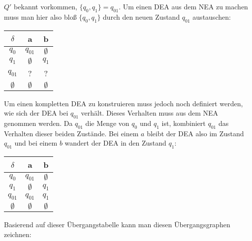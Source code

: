 \begin{flushleft}
    $Q'$ bekannt vorkommen, $\{q_0,q_1\}=q_{01}$. Um einen DEA aus dem NEA zu machen muss man hier also bloß 
    $\{q_0,q_1\}$ durch den neuen Zustand $q_{01}$ austauschen:
    \begin{center}
        \begin{tabular}{|c|c|c|}
            \hline
            $\delta$ & a & b \\
            \hline
            $q_0$ & $q_{01}$ & $\emptyset$ \\
            \hline
            $q_1$ & $\emptyset$ & $q_1$ \\
            \hline
            $q_{01}$ & ? & ? \\
            \hline
            $\emptyset$ & $\emptyset$ & $\emptyset$ \\
            \hline
        \end{tabular}
    \end{center}
    Um einen kompletten DEA zu konstruieren muss jedoch noch definiert werden, wie sich der DEA bei $q_{01}$ verhält.
    Dieses Verhalten muss aus dem NEA genommen werden. Da $q_{01}$ die Menge von $q_0$ und $q_1$ ist, kombiniert $q_{01}$
    das Verhalten dieser beiden Zustände. Bei einem $a$ bleibt der DEA also im Zustand $q_{01}$ und bei einem $b$ wandert 
    der DEA in den Zustand $q_1$:
    \begin{center}
        \begin{tabular}{|c|c|c|}
            \hline
            $\delta$ & a & b \\
            \hline
            $q_0$ & $q_{01}$ & $\emptyset$ \\
            \hline
            $q_1$ & $\emptyset$ & $q_1$ \\
            \hline
            $q_{01}$ & $q_{01}$ & $q_1$ \\
            \hline
            $\emptyset$ & $\emptyset$ & $\emptyset$ \\
            \hline
        \end{tabular}
    \end{center}
    Basierend auf dieser Übergangstabelle kann man diesen Übergangsgraphen zeichnen:
    \begin{center}
\end{center}
\end{flushleft}
